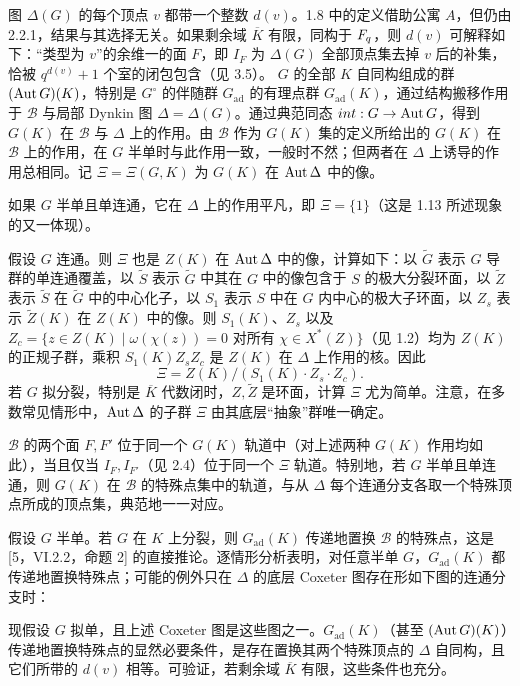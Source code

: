 图 $\Delta(G)$ 的每个顶点 $v$ 都带一个整数 $d(v)$。1.8 中的定义借助公寓 $A$，但仍由 2.2.1，结果与其选择无关。如果剩余域 $\overline K$ 有限，同构于 $F_q$，则 $d(v)$ 可解释如下：“类型为 $v$”的余维一的面 $F$，即 $I_F$ 为 $\Delta(G)$ 全部顶点集去掉 $v$ 后的补集，恰被 $q^{d(v)}+1$ 个室的闭包包含（见 3.5）。
$G$ 的全部 $K$ 自同构组成的群 $(\Aut G)(K)$，特别是 $G^\circ$ 的伴随群 $G_{\mathrm{ad}}$ 的有理点群 $G_{\mathrm{ad}}(K)$，通过结构搬移作用于 $\mathscr B$ 与局部 Dynkin 图 $\Delta=\Delta(G)$。通过典范同态 $\operatorname{int}:G\to\Aut G$，得到 $G(K)$ 在 $\mathscr B$ 与 $\Delta$ 上的作用。由 $\mathscr B$ 作为 $G(K)$ 集的定义所给出的 $G(K)$ 在 $\mathscr B$ 上的作用，在 $G$ 半单时与此作用一致，一般时不然；但两者在 $\Delta$ 上诱导的作用总相同。记 $\Xi=\Xi(G,K)$ 为 $G(K)$ 在 $\Aut\Delta$ 中的像。

如果 $G$ 半单且单连通，它在 $\Delta$ 上的作用平凡，即 $\Xi=\{1\}$（这是 1.13 所述现象的又一体现）。

假设 $G$ 连通。则 $\Xi$ 也是 $Z(K)$ 在 $\Aut\Delta$ 中的像，计算如下：以 $\widetilde G$ 表示 $G$ 导群的单连通覆盖，以 $\widetilde S$ 表示 $\widetilde G$ 中其在 $G$ 中的像包含于 $S$ 的极大分裂环面，以 $\widetilde Z$ 表示 $\widetilde S$ 在 $\widetilde G$ 中的中心化子，以 $S_1$ 表示 $S$ 中在 $G$ 内中心的极大子环面，以 $Z_s$ 表示 $\widetilde Z(K)$ 在 $Z(K)$ 中的像。则 $S_1(K)$、$Z_s$ 以及 $Z_c=\{z\in Z(K)\mid\omega(\chi(z))=0\text{ 对所有 }\chi\in X^*(Z)\}$（见 1.2）均为 $Z(K)$ 的正规子群，乘积 $S_1(K)Z_sZ_c$ 是 $Z(K)$ 在 $\Delta$ 上作用的核。因此
\[
\Xi=Z(K)/(S_1(K)\cdot Z_s\cdot Z_c).
\]
若 $G$ 拟分裂，特别是 $\overline K$ 代数闭时，$Z,\widetilde Z$ 是环面，计算 $\Xi$ 尤为简单。注意，在多数常见情形中，$\Aut\Delta$ 的子群 $\Xi$ 由其底层“抽象”群唯一确定。

$\mathscr B$ 的两个面 $F,F'$ 位于同一个 $G(K)$ 轨道中（对上述两种 $G(K)$ 作用均如此），当且仅当 $I_F,I_{F'}$（见 2.4）位于同一个 $\Xi$ 轨道。特别地，若 $G$ 半单且单连通，则 $G(K)$ 在 $\mathscr B$ 的特殊点集中的轨道，与从 $\Delta$ 每个连通分支各取一个特殊顶点所成的顶点集，典范地一一对应。

假设 $G$ 半单。若 $G$ 在 $K$ 上分裂，则 $G_{\mathrm{ad}}(K)$ 传递地置换 $\mathscr B$ 的特殊点，这是 [5，VI.2.2，命题 2] 的直接推论。逐情形分析表明，对任意半单 $G$，$G_{\mathrm{ad}}(K)$ 都传递地置换特殊点；可能的例外只在 $\Delta$ 的底层 Coxeter 图存在形如下图的连通分支时：
\begin{center}
\end{center}
现假设 $G$ 拟单，且上述 Coxeter 图是这些图之一。$G_{\mathrm{ad}}(K)$（甚至 $(\Aut G)(K)$）传递地置换特殊点的显然必要条件，是存在置换其两个特殊顶点的 $\Delta$ 自同构，且它们所带的 $d(v)$ 相等。可验证，若剩余域 $\overline K$ 有限，这些条件也充分。

